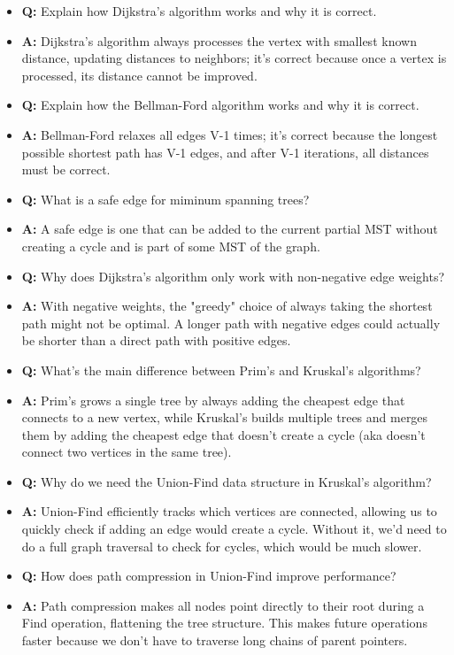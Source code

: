 \documentclass[11pt,a4paper]{article}
\begin{document}
\begin{multicols}{2}
\begin{itemize}
    \item \textbf{Q:} Explain how Dijkstra's algorithm works and why it is correct.
    \item \textbf{A:} Dijkstra's algorithm always processes the vertex with smallest known distance, updating distances to neighbors; it's correct because once a vertex is processed, its distance cannot be improved.

    \item \textbf{Q:} Explain how the Bellman-Ford algorithm works and why it is correct.
    \item \textbf{A:} Bellman-Ford relaxes all edges V-1 times; it's correct because the longest possible shortest path has V-1 edges, and after V-1 iterations, all distances must be correct.

    \item \textbf{Q:} What is a safe edge for miminum spanning trees?
    \item \textbf{A:} A safe edge is one that can be added to the current partial MST without creating a cycle and is part of some MST of the graph.
    
    \item \textbf{Q:} Why does Dijkstra's algorithm only work with non-negative edge weights?
    \item \textbf{A:} With negative weights, the "greedy" choice of always taking the shortest path might not be optimal. A longer path with negative edges could actually be shorter than a direct path with positive edges.

    \item \textbf{Q:} What's the main difference between Prim's and Kruskal's algorithms?
    \item \textbf{A:} Prim's grows a single tree by always adding the cheapest edge that connects to a new vertex, while Kruskal's builds multiple trees and merges them by adding the cheapest edge that doesn't create a cycle (aka doesn't connect two vertices in the same tree).

    \item \textbf{Q:} Why do we need the Union-Find data structure in Kruskal's algorithm?
    \item \textbf{A:} Union-Find efficiently tracks which vertices are connected, allowing us to quickly check if adding an edge would create a cycle. Without it, we'd need to do a full graph traversal to check for cycles, which would be much slower.

    \item \textbf{Q:} How does path compression in Union-Find improve performance?
    \item \textbf{A:} Path compression makes all nodes point directly to their root during a Find operation, flattening the tree structure. This makes future operations faster because we don't have to traverse long chains of parent pointers.


\end{itemize}
\end{multicols}
\end{document}
